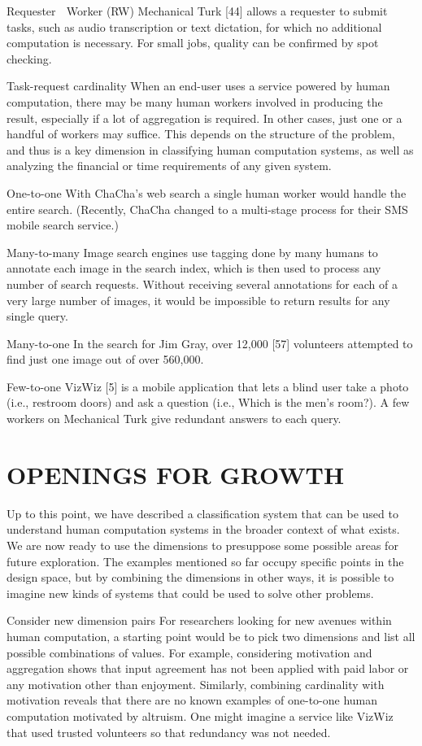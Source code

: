 \documentclass{acm_proc_article-sp} %
\begin{document}
Requester  Worker (RW) Mechanical Turk [44] allows a requester to submit tasks, such as audio transcription or text dictation, for which no additional computation is necessary.  For small jobs, quality can be confirmed by spot checking. 

Task-request cardinality When an end-user uses a service powered by human computation, there may be many human workers involved in producing the result, especially if a lot of aggregation is required. In other cases, just one or a handful of workers may suffice. This depends on the structure of the problem, and thus is a key dimension in classifying human computation systems, as well as analyzing the financial or time requirements of any given system. 

One-to-one With ChaCha’s web search a single human worker would handle the entire search. (Recently, ChaCha changed to a multi-stage process for their SMS mobile search service.)

Many-to-many Image search engines use tagging done by many humans to annotate each image in the search index, which is then used to process any number of search requests. Without receiving several annotations for each of a very large number of images, it would be impossible to return results for any single query. 

Many-to-one In the search for Jim Gray, over 12,000  [57] volunteers attempted to find just one image out of over 560,000. 

Few-to-one VizWiz [5] is a mobile application that lets a blind user take a photo (i.e., restroom doors) and ask a question (i.e., Which is the men’s room?). A few workers on Mechanical Turk give redundant answers to each query.

\section{OPENINGS FOR GROWTH} Up to this point, we have described a classification system that can be used to understand human computation systems in the broader context of what exists. We are now ready to use the dimensions to presuppose some possible areas for future exploration. The examples mentioned so far occupy specific points in the design space, but by combining the dimensions in other ways, it is possible to imagine new kinds of systems that could be used to solve other problems. 

Consider new dimension pairs For researchers looking for new avenues within human computation, a starting point would be to pick two dimensions and list all possible combinations of values. For example, considering motivation and aggregation shows that input agreement has not been applied with paid labor or any motivation other than enjoyment. Similarly, combining cardinality with motivation reveals that there are no known examples of one-to-one human computation motivated by altruism. One might imagine a service like VizWiz that used trusted volunteers so that redundancy was not needed.
\end{document}
